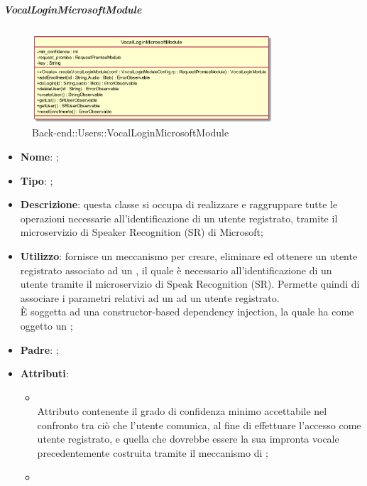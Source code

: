\hypertarget{VocalLoginMicrosoftModule_label}{\subparagraph{VocalLoginMicrosoftModule}}
\begin{figure}[h]
	\centering
	\includegraphics[width=0.80\textwidth,height=\textheight,keepaspectratio]{images/ClassVocalLoginMicrosoftModule.png}
	\caption{Back-end::Users::VocalLoginMicrosoftModule}
\end{figure}
\begin{itemize}
	\item \textbf{Nome}: ;
	\item \textbf{Tipo}: ;
	\item \textbf{Descrizione}: questa classe si occupa di realizzare e raggruppare tutte le operazioni necessarie all'identificazione di un utente registrato, tramite il microservizio di Speaker Recognition (SR) di Microsoft;
	\item \textbf{Utilizzo}: fornisce un meccanismo per creare, eliminare ed ottenere un utente registrato associato ad un , il quale è necessario all'identificazione di un utente tramite il microservizio di Speak Recognition (SR). Permette quindi di associare i parametri relativi ad un  ad un utente registrato.\\
	È soggetta ad una constructor-based dependency injection, la quale ha come oggetto un ;
	\item \textbf{Padre}: ;
	\item \textbf{Attributi}:
	\begin{itemize}
		\item[]  \\
		Attributo contenente il grado di confidenza minimo accettabile nel confronto tra ciò che l'utente comunica, al fine di effettuare l'accesso come utente registrato, e quella che dovrebbe essere la sua impronta vocale precedentemente costruita tramite il meccanismo di ;
		\item[]  \\

\end{itemize}
\end{itemize}
